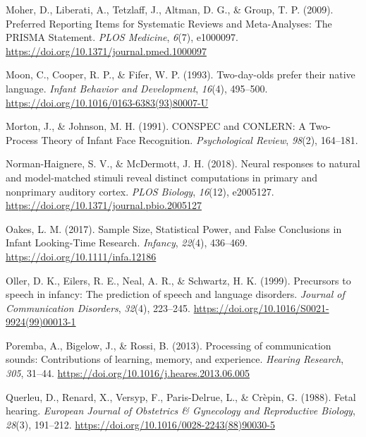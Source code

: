 \documentclass[
  man]{apa6}
\begin{document}
\leavevmode\hypertarget{ref-moher_preferred_2009}{}%
Moher, D., Liberati, A., Tetzlaff, J., Altman, D. G., \& Group, T. P. (2009). Preferred Reporting Items for Systematic Reviews and Meta-Analyses: The PRISMA Statement. \emph{PLOS Medicine}, \emph{6}(7), e1000097. \url{https://doi.org/10.1371/journal.pmed.1000097}

\leavevmode\hypertarget{ref-moon_two-day-olds_1993}{}%
Moon, C., Cooper, R. P., \& Fifer, W. P. (1993). Two-day-olds prefer their native language. \emph{Infant Behavior and Development}, \emph{16}(4), 495--500. \url{https://doi.org/10.1016/0163-6383(93)80007-U}

\leavevmode\hypertarget{ref-morton_conspec_1991}{}%
Morton, J., \& Johnson, M. H. (1991). CONSPEC and CONLERN: A Two-Process Theory of Infant Face Recognition. \emph{Psychological Review}, \emph{98}(2), 164--181.

\leavevmode\hypertarget{ref-norman-haignere_neural_2018}{}%
Norman-Haignere, S. V., \& McDermott, J. H. (2018). Neural responses to natural and model-matched stimuli reveal distinct computations in primary and nonprimary auditory cortex. \emph{PLOS Biology}, \emph{16}(12), e2005127. \url{https://doi.org/10.1371/journal.pbio.2005127}

\leavevmode\hypertarget{ref-oakes_sample_2017}{}%
Oakes, L. M. (2017). Sample Size, Statistical Power, and False Conclusions in Infant Looking-Time Research. \emph{Infancy}, \emph{22}(4), 436--469. \url{https://doi.org/10.1111/infa.12186}

\leavevmode\hypertarget{ref-oller_precursors_1999}{}%
Oller, D. K., Eilers, R. E., Neal, A. R., \& Schwartz, H. K. (1999). Precursors to speech in infancy: The prediction of speech and language disorders. \emph{Journal of Communication Disorders}, \emph{32}(4), 223--245. \url{https://doi.org/10.1016/S0021-9924(99)00013-1}

\leavevmode\hypertarget{ref-poremba_processing_2013}{}%
Poremba, A., Bigelow, J., \& Rossi, B. (2013). Processing of communication sounds: Contributions of learning, memory, and experience. \emph{Hearing Research}, \emph{305}, 31--44. \url{https://doi.org/10.1016/j.heares.2013.06.005}

\leavevmode\hypertarget{ref-querleu_fetal_1988}{}%
Querleu, D., Renard, X., Versyp, F., Paris-Delrue, L., \& Crèpin, G. (1988). Fetal hearing. \emph{European Journal of Obstetrics \& Gynecology and Reproductive Biology}, \emph{28}(3), 191--212. \url{https://doi.org/10.1016/0028-2243(88)90030-5}
\end{document}
